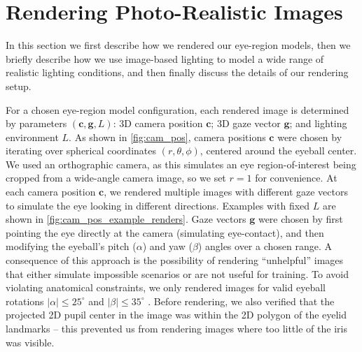 
\section{Rendering Photo-Realistic Images}


In this section we first describe how we rendered our eye-region models, then we briefly describe how we use image-based lighting \cite{debevec2002image} to model a wide range of realistic lighting conditions, and then finally discuss the details of our rendering setup.

For a chosen eye-region model configuration, each rendered image is determined by parameters $(\mathbf{c}, \mathbf{g}, L)$: 3D camera position $\mathbf{c}$; 3D gaze vector $\mathbf{g}$; and lighting environment $L$.
As shown in \autoref{fig:cam_pos}, camera positions $\mathbf{c}$ were chosen by iterating over spherical coordinates $(r, \theta, \phi)$, centered around the eyeball center.
We used an orthographic camera, as this simulates an eye region-of-interest being cropped from a wide-angle camera image, so we set $r\!=\!1$ for convenience.
At each camera position $\mathbf{c}$, we rendered multiple images with different gaze vectors to simulate the eye looking in different directions.
Examples with fixed $L$ are shown in \autoref{fig:cam_pos_example_renders}.
Gaze vectors $\mathbf{g}$ were chosen by first pointing the eye directly at the camera (simulating eye-contact), and then modifying the eyeball's pitch ($\alpha$) and yaw ($\beta$) angles over a chosen range.
%
A consequence of this approach is the possibility of rendering ``unhelpful'' images that either simulate impossible scenarios or are not useful for training.
To avoid violating anatomical constraints, we only rendered images for valid eyeball rotations $|\alpha|\!\leq\!25^{\circ}$ and $|\beta|\!\leq\!35^{\circ}$ \cite{MIL-STD-1472G}.
Before rendering, we also verified that the projected 2D pupil center in the image was within the 2D polygon of the eyelid landmarks -- this prevented us from rendering images where too little of the iris was visible.

